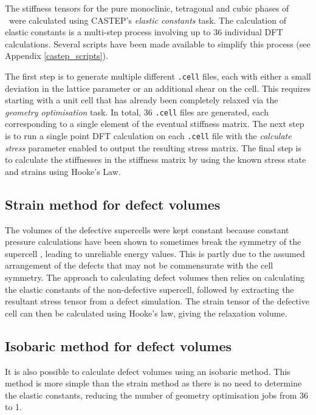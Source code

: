 The stiffness tensors for the pure monoclinic, tetragonal and cubic phases of \zirconia\ were calculated using CASTEP's \emph{elastic constants} task. The calculation of elastic constants is a multi-step process involving up to 36 individual DFT calculations. Several scripts have been made available to simplify this process (see Appendix \ref{castep_scripts}).

The first step is to generate multiple different \texttt{.cell} files, each with either a small deviation in the lattice parameter or an additional shear on the cell. This requires starting with a unit cell that has already been completely relaxed via the \emph{geometry optimisation} task. In total, 36 \texttt{.cell} files are generated, each corresponding to a single element of the eventual stiffness matrix. The next step is to run a single point DFT calculation on each \texttt{.cell} file with the \emph{calculate stress} parameter enabled to output the resulting stress matrix. The final step is to calculate the stiffnesses in the stiffness matrix by using the known stress state and strains using Hooke's Law. 

\subsection{Strain method for defect volumes}

The volumes of the defective supercells were kept constant because constant pressure calculations have been shown to sometimes break the symmetry of the supercell \cite{samanta2010thermodynamic}, leading to unreliable energy values. This is partly due to the assumed arrangement of the defects that may not be commensurate with the cell symmetry. The approach to calculating defect volumes then relies on calculating the elastic constants of the non-defective supercell, followed by extracting the resultant stress tensor from a defect simulation. The strain tensor of the defective cell can then be calculated using Hooke's law, giving the relaxation volume. 

\subsection{Isobaric method for defect volumes}

It is also possible to calculate defect volumes using an isobaric method. This method is more simple than the strain method as there is no need to determine the elastic constants, reducing the number of geometry optimisation jobs from 36 to 1. 

